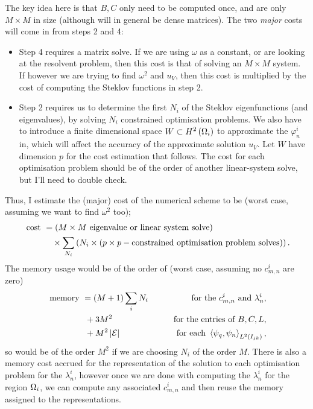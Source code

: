 \documentclass[11pt]{report}
\newcommand{\gradgradSob}[1]{H^2\bracs{#1}}
\begin{document}
The key idea here is that $B,C$ only need to be computed once, and are only $M\times M$ in size (although will in general be dense matrices).
The two \emph{major} costs will come in from steps 2 and 4:
\begin{itemize}
	\item Step 4 requires a matrix solve.
	If we are using $\omega$ as a constant, or are looking at the resolvent problem, then this cost is that of solving an $M\times M$ system.
	If however we are trying to find $\omega^2$ and $u_V$, then this cost is multiplied by the cost of computing the Steklov functions in step 2.
	\item Step 2 requires us to determine the first $N_i$ of the Steklov eigenfunctions (and eigenvalues), by solving $N_i$ constrained optimisation problems.
	We also have to introduce a finite dimensional space $W\subset\gradgradSob{\ddom_i}$ to approximate the $\varphi_n^i$ in, which will affect the accuracy of the approximate solution $u_V$.
	Let $W$ have dimension $p$ for the cost estimation that follows.
	The cost for each optimisation problem should be of the order of another linear-system solve, but I'll need to double check.
\end{itemize}
Thus, I estimate the (major) cost of the numerical scheme to be (worst case, assuming we want to find $\omega^2$ too);
\begin{align*}
	\text{ cost } 
	&= \left(  M\times M \text{ eigenvalue or linear system solve}  \right) \\
	& \quad\times \sum_{N_i}\left(  N_i \times (p\times p-\text{constrained optimisation problem solves})  \right).
\end{align*}
The memory usage would be of the order of (worst case, assuming no $c_{m,n}^i$ are zero)
\begin{align*}
	\text{ memory }
	&= (M+1)\sum_{i}N_i  &\qquad\text{for the } c_{m,n}^i \text{ and } \lambda_n^i, \\
	& \ + 3M^2 &\qquad\text{for the entries of } B, C, L, \\
	& \ + M^2\left\lvert \mathcal{E} \right\rvert &\qquad\text{for each } \left\langle \psi_q , \psi_n \right\rangle_{L^2\left( I_{jk} \right)},
\end{align*}
so would be of the order $M^2$ if we are choosing $N_i$ of the order $M$.
There is also a memory cost accrued for the representation of the solution to each optimisation problem for the $\lambda_n^i$, however once we are done with computing the $\lambda_n^i$ for the region $\Omega_i$, we can compute any associated $c_{m,n}^i$ and then reuse the memory assigned to the representations.
\end{document}
